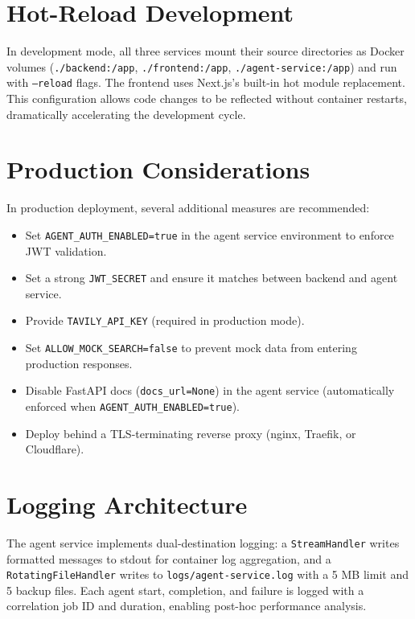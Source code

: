 \documentclass[12pt,a4paper,oneside]{book}
\begin{document}
\section{Hot-Reload Development}

In development mode, all three services mount their source directories as Docker volumes (\texttt{./backend:/app}, \texttt{./frontend:/app}, \texttt{./agent-service:/app}) and run with \texttt{--reload} flags. The frontend uses Next.js's built-in hot module replacement. This configuration allows code changes to be reflected without container restarts, dramatically accelerating the development cycle.

\section{Production Considerations}

In production deployment, several additional measures are recommended:

\begin{itemize}
  \item Set \texttt{AGENT\_AUTH\_ENABLED=true} in the agent service environment to enforce JWT validation.
  \item Set a strong \texttt{JWT\_SECRET} and ensure it matches between backend and agent service.
  \item Provide \texttt{TAVILY\_API\_KEY} (required in production mode).
  \item Set \texttt{ALLOW\_MOCK\_SEARCH=false} to prevent mock data from entering production responses.
  \item Disable FastAPI docs (\texttt{docs\_url=None}) in the agent service (automatically enforced when \texttt{AGENT\_AUTH\_ENABLED=true}).
  \item Deploy behind a TLS-terminating reverse proxy (nginx, Traefik, or Cloudflare).
\end{itemize}

\section{Logging Architecture}

The agent service implements dual-destination logging: a \texttt{StreamHandler} writes formatted messages to stdout for container log aggregation, and a \texttt{RotatingFileHandler} writes to \texttt{logs/agent-service.log} with a 5 MB limit and 5 backup files. Each agent start, completion, and failure is logged with a correlation job ID and duration, enabling post-hoc performance analysis.
\end{document}
